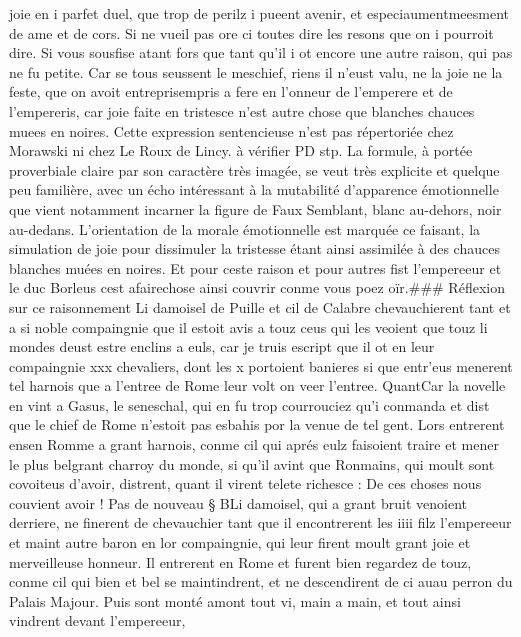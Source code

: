\documentclass{article}
\begin{document}
\begin{pages}
   joie en i parfet duel,
   que trop de perilz i pueent avenir, et especiaumentmeesment de ame et de cors.
   Si ne vueil pas ore ci toutes dire les resons que on i pourroit dire. Si vous sousfise atant fors que
   tant qu’il i ot encore une autre raison, qui pas ne fu petite. Car se tous seussent le meschief,
   riens il n’eust valu, ne la joie ne la feste, que on avoit 
   entreprisempris a fere 
   en l’onneur de l’emperere et de l’empereris,
   car joie faite en tristesce n’est autre chose que blanches chauces muees en noires.
   Cette expression sentencieuse n'est pas répertoriée chez Morawski ni chez Le Roux de Lincy. à vérifier PD stp.
   La formule, à portée proverbiale claire par son caractère très imagée, se veut très explicite et quelque peu familière, 
   avec un écho intéressant à la mutabilité d'apparence émotionnelle que vient notamment incarner la figure de Faux Semblant, 
   blanc au-dehors, noir au-dedans. L'orientation de la morale émotionnelle est marquée ce faisant, la simulation de joie pour 
   dissimuler la tristesse étant ainsi assimilée à des chauces blanches muées en noires.
   Et pour ceste raison et pour autres fist l’empereeur et
   le duc Borleus cest afairechose 
   ainsi couvrir conme vous poez oïr.### Réflexion sur ce raisonnement \pend
\pstart Li damoisel de Puille
   et cil de Calabre
   chevauchierent tant et a si noble compaingnie que il estoit avis a touz ceus qui les veoient que
   touz li mondes deust estre enclins a euls, car
   je truis escript que il ot en leur compaingnie xxx chevaliers, dont les
   x portoient banieres si que entr’eus menerent tel harnois que a l’entree de Rome
   leur volt on veer l’entree. QuantCar la novelle en vint a 
   Gasus, le seneschal, qui en fu trop courrouciez qu’i 
   conmanda et dist que le chief de Rome n’estoit pas esbahis por 
      la venue de tel gent. Lors entrerent ensen Romme a grant harnois, 
   conme cil qui aprés eulz faisoient traire et mener le plus 
   belgrant charroy du monde, 
   si qu’il avint que Ronmains, qui moult sont covoiteus d’avoir, distrent,
   quant il virent telete richesce : 
   De ces choses 
      nous couvient avoir ! \pend
\pstart Pas de nouveau § BLi damoisel, qui a grant bruit venoient derriere,
   ne finerent de chevauchier tant que il encontrerent les iiii filz
   l’empereeur et maint autre baron en lor compaingnie,
   qui leur firent moult grant joie et merveilleuse honneur. Il entrerent en Rome
   et furent bien regardez de touz, conme cil qui bien et bel se maintindrent, et ne descendirent de ci 
   auau perron du Palais Majour.
   Puis sont monté amont tout vi, main a main, et tout ainsi vindrent devant l’empereeur, 

\end{pages}
\end{document}
